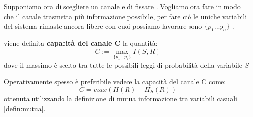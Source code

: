 Supponiamo ora di scegliere un canale e di fissare \lepc . Vogliamo ora fare in modo che il canale trasmetta più informazione possibile, per fare ciò le uniche variabili del sistema rimaste ancora libere con cuoi possiamo lavorare sono $\{p_1...p_n \}$ .
\begin{defi}
viene definita \textbf{capacità del canale C} la quantità:
\begin{equation}
C:= \max_{ \{ p_1...p_n \}} I(S,R)
\end{equation}
dove il massimo è scelto tra tutte le possibili leggi di probabilità della variabile $S$
\end{defi}
Operativamente spesso è preferibile vedere la capacità del canale C come:
\begin{equation}
C=max(H(R)-H_S(R))
\end{equation}
ottenuta utilizzando la definizione di mutua informazione tra variabili casuali \ref{defin:mutua}.\\
